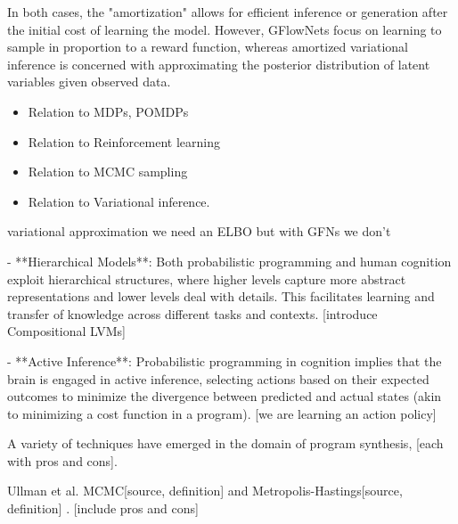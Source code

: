 In both cases, the "amortization" allows for efficient inference or generation after the initial cost of learning the model. However, GFlowNets focus on learning to sample in proportion to a reward function, whereas amortized variational inference is concerned with approximating the posterior distribution of latent variables given observed data.





\begin{itemize}
    \item Relation to MDPs, POMDPs
    \item Relation to Reinforcement learning
    \item Relation to MCMC sampling
    \item Relation to Variational inference. 
\end{itemize}


variational approximation we need an ELBO but with GFNs we don't 









- **Hierarchical Models**: Both probabilistic programming and human cognition exploit hierarchical structures, where higher levels capture more abstract representations and lower levels deal with details. This facilitates learning and transfer of knowledge across different tasks and contexts. [introduce Compositional LVMs]

- **Active Inference**: Probabilistic programming in cognition implies that the brain is engaged in active inference, selecting actions based on their expected outcomes to minimize the divergence between predicted and actual states (akin to minimizing a cost function in a program). [we are learning an action policy]












A variety of techniques have emerged in the domain of program synthesis, [each with pros and cons].

Ullman et al. MCMC[source, definition] and Metropolis-Hastings[source, definition] \cite{ullman_theory_2012}. [include pros and cons]


